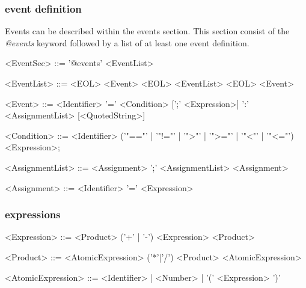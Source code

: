 \documentclass[a4paper]{article}
\begin{document}
\subsubsection*{event definition}
Events can be described within the events section. This section consist of the \emph{@events} keyword followed by a list of at least one event definition. 
\begin{table} [h!]
\begin{grammar}
<EventSec> ::= '@events' <EventList>

<EventList> ::= <EOL> <Event> <EOL> <EventList>
  \alt <EOL> <Event>
  
<Event> ::= <Identifier> '=' <Condition> [';' <Expression>] ':' <AssignmentList> [<QuotedString>]

<Condition> ::= <Identifier> ('"=="' | '"!="' | '">"' | '">="' | '"<"' | '"<="') <Expression>;

<AssignmentList> ::= <Assignment> ';' <AssignmentList>
  \alt <Assignment>
  
<Assignment> ::= <Identifier> '=' <Expression>
\end{grammar}
\end{table}


\subsubsection*{expressions}
\begin{table}[h!]
\begin{grammar}
<Expression> ::= <Product> ('+' | '-') <Expression>
 \alt <Product>
 
<Product> ::= <AtomicExpression> ('*'|'/') <Product>
  \alt <AtomicExpression>
  
<AtomicExpression> ::= <Identifier> | <Number> | '(' <Expression> ')'
\end{grammar}
\end{table}
\end{document}
